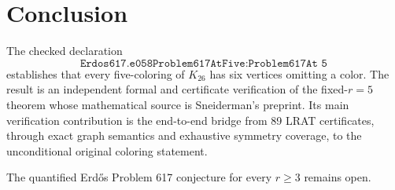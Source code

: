 \documentclass[11pt,reqno,a4paper]{amsart}
\theoremstyle{definition}
\theoremstyle{remark}
\newcommand{\code}[1]{\texttt{#1}}
\begin{document}
\section{Conclusion}

The checked declaration
\[
  \code{Erdos617.e058Problem617AtFive} :
  \code{Problem617At 5}
\]
establishes that every five-coloring of \(K_{26}\) has six vertices omitting
a color.  The result is an independent formal and certificate verification
of the fixed-\(r=5\) theorem whose mathematical source is Sneiderman's
preprint.  Its main verification contribution is the end-to-end bridge from
89 LRAT certificates, through exact graph semantics and exhaustive symmetry
coverage, to the unconditional original coloring statement.

The quantified Erd\H{o}s Problem 617 conjecture for every \(r\ge3\) remains
open.



\end{document}
